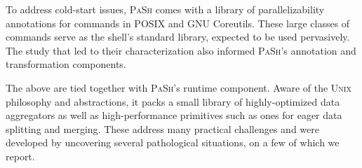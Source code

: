 \documentclass[sigplan, review, screen, anonymous]{acmart}
\newcommand{\ttt}[1]{\texttt{#1}}
\newcommand{\sys}{{\scshape PaSh}\xspace}
\newcommand{\unix}{{\scshape Unix}\xspace}
\begin{document}
To address cold-start issues, \sys comes with a library of parallelizability annotations for commands in POSIX and GNU Coreutils.
These large classes of commands serve as the shell's standard library, expected to be used pervasively. %
The study that led to their characterization also informed \sys's annotation and transformation components.

The above are tied together with \sys's runtime component.
Aware of the \unix philosophy and abstractions, it packs a small library of highly-optimized data aggregators as well as high-performance primitives such as ones for eager data splitting and merging.
These address many practical challenges %
  and were developed by uncovering several pathological situations, on a few of which we report.


\end{document}
